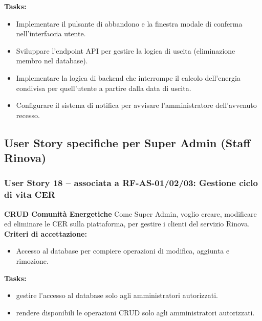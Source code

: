 \textbf{Tasks:}
\begin{itemize}
    \item Implementare il pulsante di abbandono e la finestra modale di conferma nell'interfaccia utente.
    \item Sviluppare l'endpoint API per gestire la logica di uscita (eliminazione membro nel database).
    \item Implementare la logica di backend che interrompe il calcolo dell'energia condivisa per quell'utente a partire dalla data di uscita.
    \item Configurare il sistema di notifica per avvisare l'amministratore dell'avvenuto recesso.
\end{itemize}

\subsection{User Story specifiche per Super Admin (Staff Rinova)}

\subsubsection*{User Story 18 – associata a RF-AS-01/02/03: Gestione ciclo di vita CER}
\textbf{CRUD Comunità Energetiche}
Come Super Admin, voglio creare, modificare ed eliminare le CER sulla piattaforma, per gestire i clienti del servizio Rinova.
\textbf{Criteri di accettazione:}
\begin{itemize}
    \item Accesso al database per compiere operazioni di modifica, aggiunta e rimozione.
\end{itemize}
\textbf{Tasks:}
\begin{itemize}
    \item gestire l'accesso al database solo agli amministratori autorizzati.
    \item rendere disponibili le operazioni CRUD solo agli amministratori autorizzati.
\end{itemize}

